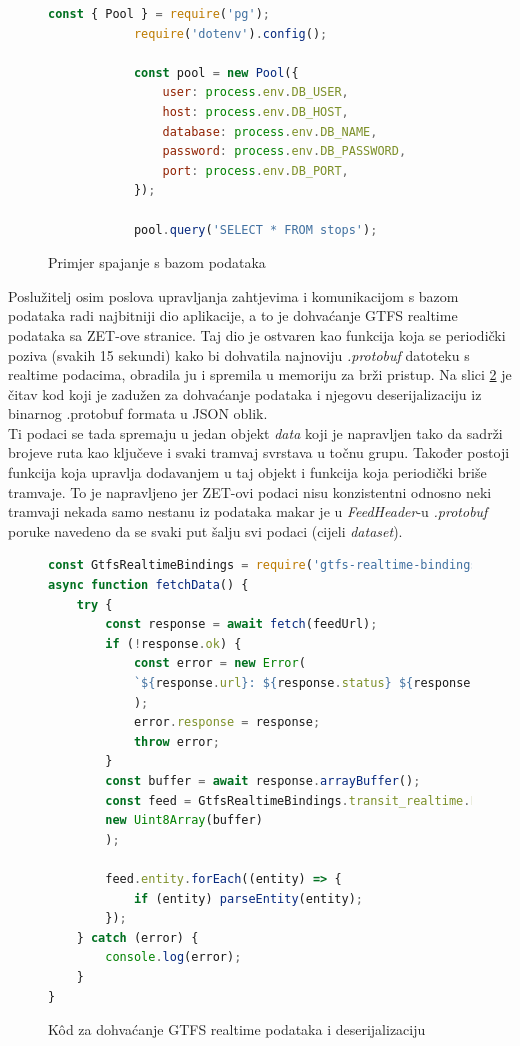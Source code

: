 \documentclass[zavrsnirad]{fer}
\begin{document}
\begin{figure}[H]
	\centering
	\begin{minipage}{0.9\linewidth}
		\begin{lstlisting}[language=JavaScript]
			const { Pool } = require('pg');
			require('dotenv').config();

			const pool = new Pool({
				user: process.env.DB_USER,
				host: process.env.DB_HOST,
				database: process.env.DB_NAME,
				password: process.env.DB_PASSWORD,
				port: process.env.DB_PORT,
			});
			
			pool.query('SELECT * FROM stops');
		\end{lstlisting}
	\end{minipage}
	\caption{Primjer spajanje s bazom podataka}
	\label{slk:baza}
\end{figure}

Poslužitelj osim poslova upravljanja zahtjevima i komunikacijom s bazom podataka radi najbitniji dio aplikacije, a to je dohvaćanje GTFS realtime podataka sa ZET-ove stranice. Taj dio je ostvaren kao funkcija koja se periodički poziva (svakih 15 sekundi) kako bi dohvatila najnoviju \textit{.protobuf} datoteku s realtime podacima, obradila ju i spremila u memoriju za brži pristup. Na slici \ref{slk:dohvatGTFS} je čitav kod koji je zadužen za dohvaćanje podataka i njegovu deserijalizaciju iz binarnog .protobuf formata u JSON oblik.\\
Ti podaci se tada spremaju u jedan objekt \textit{data} koji je napravljen tako da sadrži brojeve ruta kao ključeve i svaki tramvaj svrstava u točnu grupu. Također postoji funkcija koja upravlja dodavanjem u taj objekt i funkcija koja periodički briše tramvaje. To je napravljeno jer ZET-ovi podaci nisu konzistentni odnosno neki tramvaji nekada samo nestanu iz podataka makar je u \textit{FeedHeader}-u \textit{.protobuf} poruke navedeno da se svaki put šalju svi podaci (cijeli \textit{dataset}).

\begin{figure}[H]
	\centering
	\begin{minipage}{0.9\linewidth}
		\begin{lstlisting}[language=JavaScript]
const GtfsRealtimeBindings = require('gtfs-realtime-bindings');
async function fetchData() {
	try {
		const response = await fetch(feedUrl);
		if (!response.ok) {
			const error = new Error(
			`${response.url}: ${response.status} ${response.statusText}`
			);
			error.response = response;
			throw error;
		}
		const buffer = await response.arrayBuffer();
		const feed = GtfsRealtimeBindings.transit_realtime.FeedMessage.decode(
		new Uint8Array(buffer)
		);
		
		feed.entity.forEach((entity) => {
			if (entity) parseEntity(entity);
		});
	} catch (error) {
		console.log(error);
	}
}
		\end{lstlisting}
	\end{minipage}
	\caption{K\^od za dohvaćanje GTFS realtime podataka i deserijalizaciju}
	\label{slk:dohvatGTFS}
\end{figure}
\end{document}
